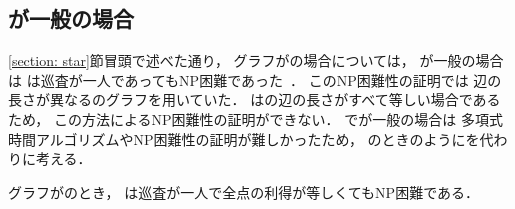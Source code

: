 \subsection{{\maxIdletime}が一般の場合}
\ref{section: star}節冒頭で述べた通り，
グラフが{\graphStar}の場合については，
{\maxIdletime}が一般の場合は
{\patProb}は巡査が一人であってもNP困難であった~\cite[Theorem~6]{coene2011charlemagne}．
このNP困難性の証明では
辺の長さが異なる{\graphStar}のグラフを用いていた．
{\graphUnit}は{\graphStar}の辺の長さがすべて等しい場合であるため，
この方法によるNP困難性の証明ができない．
{\graphUnit}で{\maxIdletime}が一般の場合は
多項式時間アルゴリズムやNP困難性の証明が難しかったため，
{\graphLine}のときのように{\timeSpecifiedPatProb}を代わりに考える．


\begin{theo}
  \label{theo:UnitExacIdletimeNPhard}
  グラフが{\graphUnit}のとき，
  {\timeSpecifiedPatProb}は巡査が一人で全点の利得が等しくてもNP困難である．
  \end{theo}

